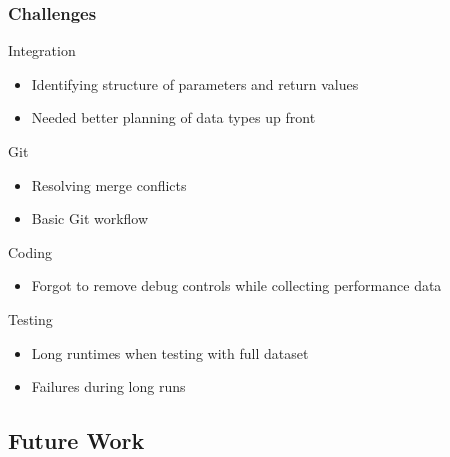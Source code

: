 \documentclass{beamer}
\begin{document}
\begin{frame}	
	\frametitle{Challenges}
	
	\begin{block}{Integration}
		\begin{itemize}
			\item Identifying structure of parameters and return values
			\item Needed better planning of data types up front
		\end{itemize}
	\end{block}
	
	\begin{block}{Git}
		\begin{itemize}
			\item Resolving merge conflicts
			\item Basic Git workflow
		\end{itemize}
	\end{block}

	\begin{block}{Coding}
		\begin{itemize}
			\item Forgot to remove debug controls while collecting performance data
		\end{itemize}
	\end{block}

	\begin{block}{Testing}
		\begin{itemize}
			\item Long runtimes when testing with full dataset
			\item Failures during long runs
		\end{itemize}
	\end{block}

\end{frame}

\subsection{Future Work}
\end{document}
